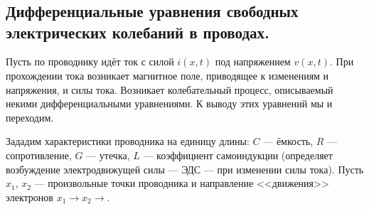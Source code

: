 \chapter{}
\label{lecture14}
\section[Телеграфные уравнения.]{Дифференциальные уравнения свободных электрических колебаний в проводах.}
\label{lecture14section1}
Пусть по проводнику идёт ток с силой $i(x,t)$ под напряжением $v(x,t)$. При прохождении тока возникает магнитное поле, приводящее к изменениям и напряжения, и силы тока. Возникает колебательный процесс, описываемый некими дифференциальными уравнениями. К выводу этих уравнений мы и переходим. 

Зададим характеристики проводника на единицу длины: $C$ --- ёмкость, $R$ --- сопротивление, $G$ --- утечка, $L$ --- коэффициент самоиндукции (определяет возбуждение электродвижущей силы --- ЭДС --- при изменении силы тока). Пусть $x_1$, $x_2$ --- произвольные точки проводника и направление <<движения>> электронов $x_1\to x_2\to$. 
\vspace{0.2cm}

\begin{figure}[H]\centering
{} %

	\caption{~}
\label{l14:fig:1}
\end{figure}

